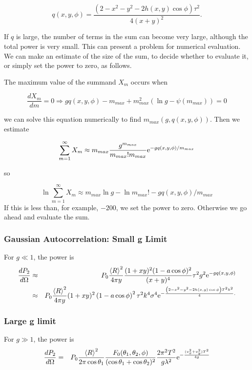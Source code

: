 \documentclass[11pt,openany]{report}
\newcommand{\der}[2]{\frac{d {#1}}{d {#2}}}
\newcommand{\e}{{\rm e}}
\begin{document}
{{$$q(x,y,\phi)=\frac{\left(2-x^{2}-y^{2}-2h(x,y)\cos\phi\right)\tau^{2}}{4(x+y)^{2}}.$$

If $q$ is large, the number of terms in the sum can become very large,
although the total power is very small. This can present a problem for
numerical evaluation.  We can make an estimate of the size of the sum,
to decide whether to evaluate it, or simply set the power to zero, as
follows.

The maximum value of the summand $X_{m}$ occurs when

$$\der{X_{m}}{m}=0\Rightarrow gq(x,y,\phi)-m_{max}+m_{max}^{2}(\ln g-\psi(m_{max}))=0$$

we can solve this equation numerically to find $m_{max}(g,q(x,y,\phi)).$ Then we estimate

$$\sum_{m=1}^{\infty}X_{m}\approx m_{max}\frac{g^{m_{max}}}{m_{max}!m_{max}}\e^{-gq(x,y,\phi)/m_{max}}$$

so

$$\ln\sum_{m=1}^{\infty}X_{m}\approx m_{max}\ln g - \ln m_{max}!-gq(x,y,\phi)/m_{max}$$
If this is less than, for example, $-200$, we set the power to zero. Otherwise we go ahead and evaluate the sum.

\subsubsection{Gaussian Autocorrelation: Small g Limit}

For $g\ll 1$, the power is
\begin{eqnarray}
\der{P_{2}}{\Omega}&\approx&P_{0}\frac{\left<R\right>^{2}}{4\pi y}\frac{(1+xy)^{2}(1-a\cos\phi)^{2}}{(x+y)^{4}}\tau^{2}g^{2}\e^{-gq(x,y,\phi)}\\
&\approx&P_{0}\frac{\left<R\right>^{2}}{4\pi y}(1+xy)^{2}\left(1-a\cos\phi\right)^{2}\tau^{2}k^{4}\sigma^{4}\e^{-\frac{\left(2-x^{2}-y^{2}-2h(x,y)\cos\phi\right)T^{2}k^{2}}{4}.}
\end{eqnarray}

\subsubsection{Large g limit}
For $g\gg 1$, the power is
\begin{eqnarray}
\der{P_{2}}{\Omega}&=&P_{0}\frac{\left<R\right>^{2}}{2\pi\cos\theta_{1}}\frac{F_{0}(\theta_{1},\theta_{2},\phi)}{(\cos{\theta_{1}}+\cos{\theta_{2}})^{2}}\frac{2\pi^{2}T^{2}}{g\lambda^{2}}\e^{-\frac{(v_{x}^{2}+v_{y}^{2})T^{2}}{4g}}\end{eqnarray}

}}
\end{document}
